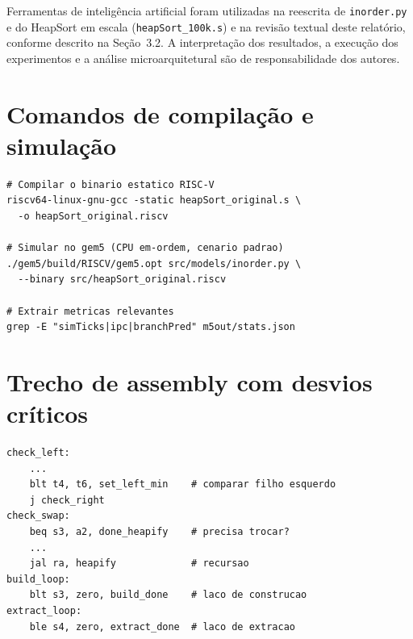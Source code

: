 \documentclass[12pt]{article}
\begin{document}
Ferramentas de inteligência artificial foram utilizadas na reescrita de \texttt{inorder.py} e do HeapSort em escala (\texttt{heapSort\_100k.s}) e na revisão textual deste relatório, conforme descrito na Seção~3.2. A interpretação dos resultados, a execução dos experimentos e a análise microarquitetural são de responsabilidade dos autores.




\appendix
\section{Comandos de compilação e simulação}
\label{ap:comandos}

\begin{verbatim}
# Compilar o binario estatico RISC-V
riscv64-linux-gnu-gcc -static heapSort_original.s \
  -o heapSort_original.riscv

# Simular no gem5 (CPU em-ordem, cenario padrao)
./gem5/build/RISCV/gem5.opt src/models/inorder.py \
  --binary src/heapSort_original.riscv

# Extrair metricas relevantes
grep -E "simTicks|ipc|branchPred" m5out/stats.json
\end{verbatim}

\section{Trecho de assembly com desvios críticos}
\label{ap:assembly}

\begin{verbatim}
check_left:
    ...
    blt t4, t6, set_left_min    # comparar filho esquerdo
    j check_right
check_swap:
    beq s3, a2, done_heapify    # precisa trocar?
    ...
    jal ra, heapify             # recursao
build_loop:
    blt s3, zero, build_done    # laco de construcao
extract_loop:
    ble s4, zero, extract_done  # laco de extracao
\end{verbatim}
\end{document}
